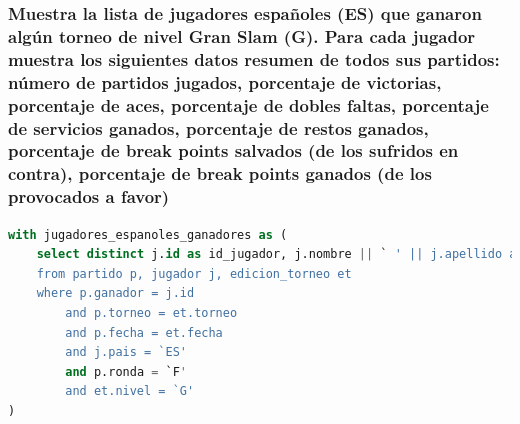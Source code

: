 \documentclass[10pt]{opticajnl}
\begin{document}
\subsubsection{Muestra la lista de jugadores españoles (ES) que ganaron algún torneo de nivel Gran Slam (G). Para cada jugador muestra los siguientes datos resumen de todos sus partidos: número de partidos jugados, porcentaje de victorias, porcentaje de aces, porcentaje de dobles faltas, porcentaje de servicios ganados, porcentaje de restos ganados, porcentaje de break points salvados (de los sufridos en contra), porcentaje de break points ganados (de los provocados a favor)}

\begin{lstlisting}[language=SQL]
with jugadores_espanoles_ganadores as (
    select distinct j.id as id_jugador, j.nombre || ` ' || j.apellido as jugador
    from partido p, jugador j, edicion_torneo et 
    where p.ganador = j.id 
        and p.torneo = et.torneo 
        and p.fecha = et.fecha
        and j.pais = `ES'
        and p.ronda = `F'
        and et.nivel = `G'
)


\end{lstlisting}
\end{document}
